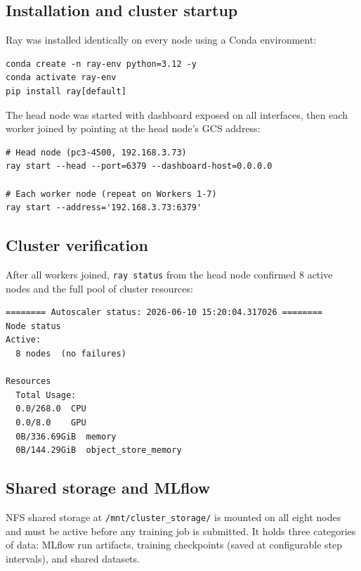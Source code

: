 \documentclass[12pt,a4paper]{article}
\begin{document}
\subsection{Installation and cluster startup}

Ray was installed identically on every node using a Conda environment:

\begin{lstlisting}[style=terminal, caption={Installation --- same steps on all 8 nodes.}]
conda create -n ray-env python=3.12 -y
conda activate ray-env
pip install ray[default]
\end{lstlisting}

The head node was started with dashboard exposed on all interfaces,
then each worker joined by pointing at the head node's GCS address:

\begin{lstlisting}[style=terminal, caption={Head and worker startup.}]
# Head node (pc3-4500, 192.168.3.73)
ray start --head --port=6379 --dashboard-host=0.0.0.0

# Each worker node (repeat on Workers 1-7)
ray start --address='192.168.3.73:6379'
\end{lstlisting}

\subsection{Cluster verification}

After all workers joined, \texttt{ray status} from the head node
confirmed 8 active nodes and the full pool of cluster resources:

\begin{lstlisting}[style=terminal, caption={Live \texttt{ray status} output captured during the workshop.}]
======== Autoscaler status: 2026-06-10 15:20:04.317026 ========
Node status
Active:
  8 nodes  (no failures)

Resources
  Total Usage:
  0.0/268.0  CPU
  0.0/8.0    GPU
  0B/336.69GiB  memory
  0B/144.29GiB  object_store_memory
\end{lstlisting}

\subsection{Shared storage and MLflow}

NFS shared storage at \texttt{/mnt/cluster\_storage/} is mounted on
all eight nodes and must be active before any training job is submitted.
It holds three categories of data: MLflow run artifacts, training
checkpoints (saved at configurable step intervals), and shared datasets.
\end{document}
